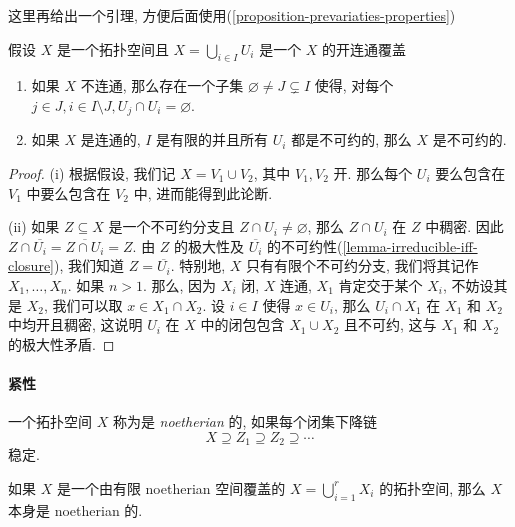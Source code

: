 这里再给出一个引理, 方便后面使用(\cref{proposition-prevariaties-properties})
\begin{lemma}
  \label{lemma-irreducible-cover}
  假设 \( X \) 是一个拓扑空间且 \( X = \bigcup_{i \in I} U_i \) 是一个 \( X \)
  的开连通覆盖
  \begin{enumerate}
    \item 如果 \( X \) 不连通, 那么存在一个子集 \( \varnothing \neq J \subsetneq
      I \) 使得, 对每个 \( j \in J, i \in I \setminus J, U_j \cap U_i =
      \varnothing \).
    \item 如果 \( X \) 是连通的, \( I \) 是有限的并且所有 \( U_i \)
      都是不可约的, 那么 \( X \) 是不可约的.
  \end{enumerate}
\end{lemma}
\begin{proof}
  (i) 根据假设, 我们记 \( X = V_1 \cup V_2 \), 其中 \( V_1, V_2 \) 开. 那么每个
  \( U_i \) 要么包含在 \( V_1 \) 中要么包含在 \( V_2 \) 中, 进而能得到此论断.

  (ii) 如果 \( Z \subseteq X \) 是一个不可约分支且 \( Z \cap U_i \neq
  \varnothing \), 那么 \( Z \cap U_i \) 在 \( Z \) 中稠密. 因此 \( Z \cap
  \overline{U_i} = \overline{Z \cap U_i} = Z \). 由 \( Z \) 的极大性及 \(
  \overline{U_i} \) 的不可约性(\cref{lemma-irreducible-iff-closure}), 我们知道
  \( Z = \overline{U_i} \). 特别地, \( X \) 只有有限个不可约分支, 我们将其记作
  \( X_1, \ldots, X_n \). 如果 \( n > 1 \). 那么, 因为 \( X_i \) 闭, \( X \) 连通,
  \( X_1 \) 肯定交于某个 \( X_i \), 不妨设其是 \( X_2 \), 我们可以取 \( x \in
  X_1 \cap X_2 \). 设 \( i \in I \) 使得 \( x \in U_i \), 那么 \( U_i \cap X_1
  \) 在 \( X_1 \) 和 \( X_2 \) 中均开且稠密, 这说明 \( U_i \) 在 \( X \)
  中的闭包包含 \( X_1 \cup X_2 \) 且不可约, 这与 \( X_1 \) 和 \( X_2 \)
  的极大性矛盾.
\end{proof}

\paragraph{紧性}

一个拓扑空间 \( X \) 称为是 \emph{noetherian} 的, 如果每个闭集下降链
\[
  X \supseteq Z_1 \supseteq Z_2 \supseteq \cdots
\]
稳定.

\begin{lemma}
  如果 \( X \) 是一个由有限 noetherian 空间覆盖的 \( X = \bigcup_{i = 1}^r X_i
  \) 的拓扑空间, 那么 \( X \) 本身是 noetherian 的.
\end{lemma}

